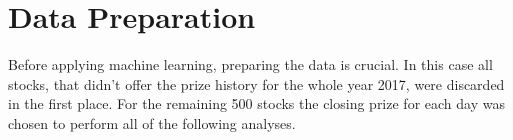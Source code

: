 
\section{Data Preparation}\label{sec:data-prep}

Before applying machine learning, preparing the data is crucial. In this case all stocks, that didn't offer the prize history for the whole year 2017, were discarded in the first place. For the remaining 500 stocks the closing prize for each day was chosen to perform all of the following analyses.

